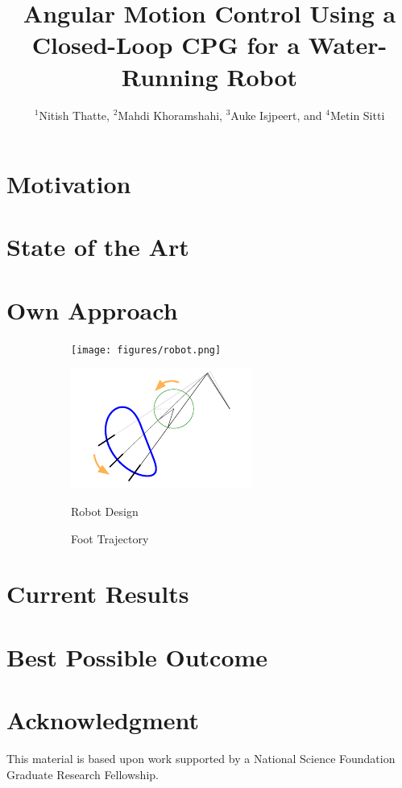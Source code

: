 \documentclass[letterpaper,twocolumn]{article}
\title{\large \textbf{Angular Motion Control Using a Closed-Loop CPG for a Water-Running Robot}}
\author{\small ${^1}$Nitish Thatte, ${^2}$Mahdi Khoramshahi, ${^3}$Auke Isjpeert, and  ${^4}$Metin Sitti}
\date{}
\begin{document}
\maketitle
\section{Motivation}


\section{State of the Art}


\section{Own Approach}


\begin{figure}[tb]
	\centering
	\begin{subfigure}[c]{0.24\textwidth}
		\centering
		\texttt{[image: figures/robot.png]}
	\end{subfigure}
	\begin{subfigure}[c]{0.24\textwidth}
		\centering
		\includegraphics[width = \textwidth]{figures/traj.pdf}
	\end{subfigure}

	\begin{subfigure}[c]{0.24\textwidth}
		\caption{Robot Design}
		\label{fig:robot}
	\end{subfigure}
	\begin{subfigure}[c]{0.24\textwidth}
		\caption{Foot Trajectory}
		\label{fig:traj}
	\end{subfigure}
	\vspace{-0.15in}
	\caption{}
	\vspace{-0.10in}
\end{figure}

\section{Current Results}


\section{Best Possible Outcome}


\section*{Acknowledgment}
This material is based upon work supported by a National Science Foundation Graduate Research Fellowship. 



\end{document}
